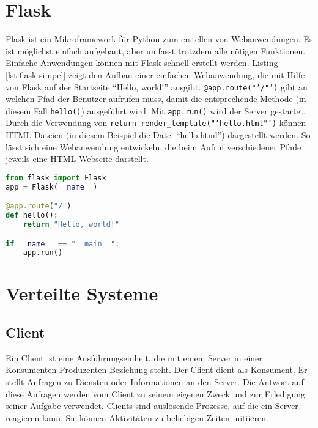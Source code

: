 \section{Flask}\label{sec:flask}
Flask ist ein Mikroframework für Python zum erstellen von Webanwendungen. Es ist
möglichst einfach aufgebaut, aber umfasst trotzdem alle nötigen Funktionen.
Einfache Anwendungen können mit Flask schnell erstellt werden. \cite{Flask2018}
Listing \ref{lst:flask-simpel} zeigt den Aufbau einer einfachen Webanwendung, die mit
Hilfe von Flask auf der Startseite "`Hello, world!"' ausgibt.
\texttt{@app.route("'/"')} gibt an welchen Pfad der Benutzer aufrufen muss,
damit die entsprechende Methode (in diesem Fall \texttt{hello()}) ausgeführt
wird. Mit \texttt{app.run()} wird der Server gestartet. Durch die Verwendung von
\texttt{return render\_template("'hello.html"')} können HTML-Dateien (in diesem
Beispiel die Datei "`hello.html"') dargestellt werden. So lässt sich eine
Webanwendung entwickeln, die beim Aufruf verschiedener Pfade jeweils eine
HTML-Webseite darstellt.

\begin{lstlisting}[float, language=Python, frame=single, framexleftmargin=15pt,
style=algoBericht, label={lst:flask-simpel}, captionpos=b, caption={Einfache
Webanwendung, die auf der Startseite "`Hello, world!"' ausgibt}]
from flask import Flask
app = Flask(__name__)

@app.route("/")
def hello():
	return "Hello, world!"

if __name__ == "__main__":
	app.run()
\end{lstlisting}

\section{Verteilte Systeme}

\subsection{Client}
Ein Client ist eine Ausführungseinheit, die mit einem Server in einer
Konsumenten-Produzenten-Beziehung steht. Der Client dient als Konsument. Er
stellt Anfragen zu Diensten oder Informationen an den Server. Die Antwort auf
diese Anfragen werden vom Client zu seinem eigenen Zweck und zur Erledigung
seiner Aufgabe verwendet. Clients sind auslösende Prozesse, auf die ein Server
reagieren kann. Sie können Aktivitäten zu beliebigen Zeiten initiieren.
\cite{Bengel2015}

